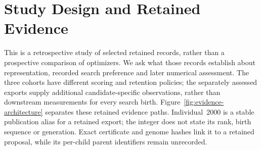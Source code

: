 \section{Study Design and Retained Evidence}
\label{sec:study-design}
This is a retrospective study of selected retained records, rather than a prospective comparison of optimizers. We ask what those records establish about representation, recorded search preference and later numerical assessment. The three cohorts have different scoring and retention policies; the separately assessed exports supply additional candidate-specific observations, rather than downstream measurements for every search birth. Figure~\ref{fig:evidence-architecture} separates these retained evidence paths. Individual~2000 is a stable publication alias for a retained export; the integer does not state its rank, birth sequence or generation. Exact certificate and genome hashes link it to a retained proposal, while its per-child parent identifiers remain unrecorded.

